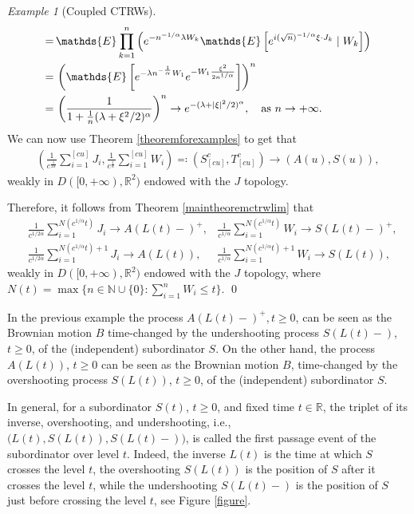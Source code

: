 \documentclass[reqno]{amsart}
\theoremstyle{remark}
\newtheorem{example}[theorem]{Example}
\numberwithin{equation}{section} %
\newcommand{\RR}{\mathbb{R}}
\newcommand{\NN}{\mathbb{N}}
\newcommand{\1}{\mathds{1}}
\begin{document}
\begin{example}[Coupled CTRWs]
\begin{align}
			= \, & \mathds{E}\prod_{k=1}^{n} \left(e^{-n^{-1/\alpha}\lambda W_k} \mathds{E} \left[ e^{i (\sqrt{n})^{-1/\alpha}\xi \cdot J_k} \mid W_k \right]\right) \notag \\
			= \, & \left( \mathds{E}\left[e^{-\lambda n^{-\frac{1}{\alpha}} W_1} e^{-W_1 \frac{\xi^2}{2n^{1/\alpha}}} \right]\right)^{n} \notag \\
			= \, & \left( \frac{1}{1+ \frac{1}{n}(\lambda + \xi^2/2)^\alpha} \right)^{n} \to e^{-(\lambda + |\xi|^2/2)^\alpha},\quad \text{as $n\to+\infty$.}
			\label{forosmall}
		\end{align}
		We can now use Theorem \ref{theoremforexamples} to get that
		\begin{align}
			\left(   \frac{1}{c^{\frac{1}{2\alpha}}}  \sum_{i=1}^{[cu]} J_i, \frac{1}{c^{\frac{1}{\alpha}}} \sum_{i=1}^{[cu]} W_i  \right) \eqqcolon (S^c_{[cu]},  T^c_{[cu]}) \to (A(u), S(u)),
		\end{align}
		weakly in $D([0, +\infty), {\mathbb{R}^{2}})$ endowed with the $J$ topology.
		
		Therefore, it follows from Theorem \ref{maintheoremctrwlim} that
		\begin{align}
			&    \frac{1}{c^{1/2\alpha}}\sum_{i=1}^{N(c^{1/\alpha}t)}J_i \to A(L(t)-)^+, &  \frac{1}{c^{1/\alpha}}\sum_{i=1}^{N(c^{1/\alpha}t)}W_i \to S(L(t)-)^+, \\
			&    \frac{1}{c^{1/2\alpha}}\sum_{i=1}^{N(c^{1/\alpha}t)+1}J_i \to A(L(t)), &  \frac{1}{c^{1/\alpha}}\sum_{i=1}^{N(c^{1/\alpha}t)+1}W_i \to S(L(t)),
		\end{align}
		weakly in $D([0, +\infty), {\mathbb{R}^{2}})$ endowed with the $J$ topology, where $N(t)=\max\{n\in \NN\cup\{0\}: \sum_{i=1}^nW_i\le t\}$.
		\qed
	\end{example}
	
	In the previous example the process $A(L(t)-)^+, t \geq 0$, can be seen as the Brownian motion $B$ time-changed by the undershooting process $S(L(t)-)$, $t\ge0$, of the (independent) subordinator $S$. On the other hand, the process $A(L(t))$, $t \geq 0$ can be seen as the Brownian motion $B$, time-changed by the overshooting process $S(L(t))$, $t\ge0$, of the (independent) subordinator $S$.
	
	In general, for a subordinator $S(t)$, $t\ge0$,  and fixed time $t\in \RR$, the triplet of its inverse, overshooting, and undershooting, i.e., $\big(L(t),S(L(t)), S(L(t)-)\big)$, is called the first passage event of the subordinator over level $t$. Indeed, the inverse $L(t)$ is the time at which $S$ crosses the level $t$, the overshooting $S(L(t))$ is the position of $S$ after it crosses the level $t$, while the undershooting $S(L(t)-)$ is the position of $S$ just before crossing the level $t$, see Figure \ref{figure}.
	
\end{document}
